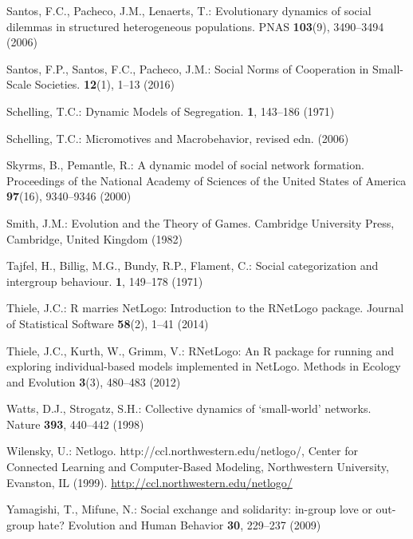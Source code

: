 \begin{thebibliography}{10}
	Santos, F.C., Pacheco, J.M., Lenaerts, T.: {Evolutionary dynamics of social
		dilemmas in structured heterogeneous populations}.
	\newblock PNAS \textbf{103}(9), 3490--3494 (2006)
	
	Santos, F.P., Santos, F.C., Pacheco, J.M.: {Social Norms of Cooperation in
		Small-Scale Societies}.
	 \textbf{12}(1), 1--13 (2016)
	
	Schelling, T.C.: {Dynamic Models of Segregation}.
	 \textbf{1}, 143--186 (1971)
	
	Schelling, T.C.: {Micromotives and Macrobehavior}, revised edn.
	 (2006)
	
	Skyrms, B., Pemantle, R.: A dynamic model of social network formation.
	\newblock Proceedings of the National Academy of Sciences of the United States
	of America \textbf{97}(16), 9340--9346 (2000)
	
	Smith, J.M.: Evolution and the Theory of Games.
	\newblock Cambridge University Press, Cambridge, United Kingdom (1982)
	
	Tajfel, H., Billig, M.G., Bundy, R.P., Flament, C.: Social categorization and
	intergroup behaviour.
	 \textbf{1}, 149--178 (1971)
	
	Thiele, J.C.: {R} marries {NetLogo}: Introduction to the {RNetLogo} package.
	\newblock Journal of Statistical Software \textbf{58}(2), 1--41 (2014)
	
	Thiele, J.C., Kurth, W., Grimm, V.: {RNetLogo}: An {R} package for running and
	exploring individual-based models implemented in {NetLogo}.
	\newblock Methods in Ecology and Evolution \textbf{3}(3), 480--483 (2012)
	
	Watts, D.J., Strogatz, S.H.: {Collective dynamics of `small-world' networks}.
	\newblock Nature \textbf{393}, 440--442 (1998)
	
	Wilensky, U.: Netlogo.
	\newblock http://ccl.northwestern.edu/netlogo/, Center for Connected Learning
	and Computer-Based Modeling, Northwestern University, Evanston, IL (1999).
	\newblock \urlprefix\url{http://ccl.northwestern.edu/netlogo/}
	
	Yamagishi, T., Mifune, N.: Social exchange and solidarity: in-group love or
	out-group hate?
	\newblock Evolution and Human Behavior \textbf{30}, 229--237 (2009)
	
\end{thebibliography}




